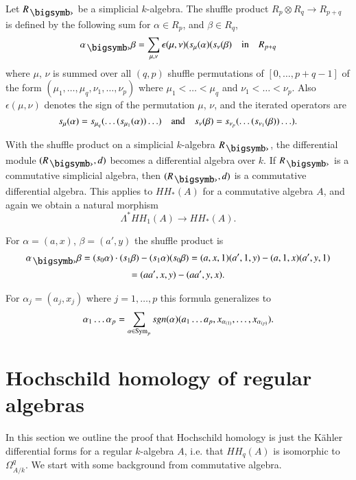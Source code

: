 \begin{definition}\label{chap6-defi2.9}
Let $R_{\bigdot}$ be a simplicial $k$-algebra. The shuffle product
$R_{p}\otimes R_{q}\to R_{p+q}$ is defined by the following sum for
$\alpha\in R_{p}$, and $\beta\in R_{q}$,
$$
\alpha_{\bigdot}\beta=\sum_{\mu,\nu}\epsilon(\mu,\nu)(s_{\mu}(\alpha)(s_{\nu}(\beta)\q\text{in}\q R_{p+q}
$$
where $\mu$, $\nu$ is summed over all $(q,p)$ shuffle permutations of
$[0,\ldots,p+q-1]$ of the form
$(\mu_{1},\ldots,\mu_{q},\nu_{1},\ldots,\nu_{p})$ where
$\mu_{1}<\ldots<\mu_{q}$ and
$\nu_{1}<\ldots<\nu_{p}$. Also\pageoriginale $\epsilon(\mu,\nu)$
denotes the sign of the permutation $\mu$, $\nu$, and the iterated
operators are
$$
s_{\mu}(\alpha)=s_{\mu_{q}}(\ldots(s_{\mu_{1}}(\alpha))\ldots)\quad\text{and}\quad
s_{\nu}(\beta)=s_{\nu_{p}}(\ldots(s_{\nu_{1}}(\beta))\ldots). 
$$
\end{definition}

\begin{remark}\label{chap6-rem2.10}
With the shuffle product on a simplicial $k$-algebra $R_{\bigdot}$,
the differential module $(R_{\bigdot},d)$ becomes a differential
algebra over $k$. If $R_{\bigdot}$ is a commutative simplicial
algebra, then $(R_{\bigdot},d)$ is a commutative differential
algebra. This applies to $HH_{\ast}(A)$ for a commutative algebra $A$,
and again we obtain a natural morphism
$$
\Lambda^{*}HH_{1}(A)\to HH_{\ast}(A).
$$
\end{remark}

\begin{example}\label{chap6-exam2.11}
For $\alpha=(a,x)$, $\beta=(a',y)$ the shuffle product is
\begin{gather*}
\alpha_{\bigdot}\beta=(s_{0}\alpha)\cdot(s_{1}\beta)-(s_{1}\alpha)(s_{0}\beta)=(a,x,1)(a',1,y)-(a,1,x)(a',y,1)\\
=(aa',x,y)-(aa',y,x).
\end{gather*}

For $\alpha_{j}=(a_{j},x_{j})$ where $j=1,\ldots,p$ this formula
generalizes to 
$$
\alpha_{1}\ldots\alpha_{p}=\sum_{\alpha\in
  \operatorname{Sym}_{p}}sgn(\alpha)(a_{1}\ldots
a_{p},x_{\alpha_{(1)}},\ldots,x_{\alpha_{(p)}}). 
$$
\end{example}

\section{Hochschild homology of regular algebras}\label{chap6-sec3}

In this section we outline the proof that Hochschild homology is just
the K\"ahler differential forms for a regular $k$-algebra $A$, i.e.\@
that $HH_{q}(A)$ is isomorphic to $\Omega^{q}_{A/k}$. We start with
some background from commutative algebra.

